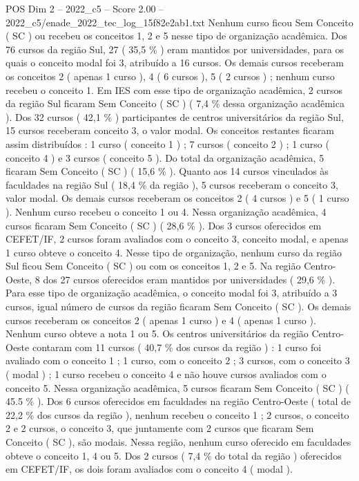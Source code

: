 \begin{textsample}{POS Dim 2 – 2022\_c5 – Score 2.00 – 2022\_c5/enade\_2022\_tec\_log\_15f82e2ab1.txt}
Nenhum curso ficou Sem Conceito ( SC ) ou recebeu os conceitos 1, 2 e 5 nesse tipo de organização acadêmica.
Dos 76 cursos da região Sul, 27 ( 35,5 \% ) eram mantidos por universidades, para os quais o conceito modal foi 3, atribuído a 16 cursos.
Os demais cursos receberam os conceitos 2 ( apenas 1 curso ), 4 ( 6 cursos ), 5 ( 2 cursos ) ; nenhum curso recebeu o conceito 1.
Em IES com esse tipo de organização acadêmica, 2 cursos da região Sul ficaram Sem Conceito ( SC ) ( 7,4 \% dessa organização acadêmica ).
Dos 32 cursos ( 42,1 \% ) participantes de centros universitários da região Sul, 15 cursos receberam conceito 3, o valor modal.
Os conceitos restantes ficaram assim distribuídos : 1 curso ( conceito 1 ) ; 7 cursos ( conceito 2 ) ; 1 curso ( conceito 4 ) e 3 cursos ( conceito 5 ).
Do total da organização acadêmica, 5 ficaram Sem Conceito ( SC ) ( 15,6 \% ).
Quanto aos 14 cursos vinculados às faculdades na região Sul ( 18,4 \% da região ), 5 cursos receberam o conceito 3, valor modal.
Os demais cursos receberam os conceitos 2 ( 4 cursos ) e 5 ( 1 curso ).
Nenhum curso recebeu o conceito 1 ou 4.
Nessa organização acadêmica, 4 cursos ficaram Sem Conceito ( SC ) ( 28,6 \% ).
Dos 3 cursos oferecidos em CEFET/IF, 2 cursos foram avaliados com o conceito 3, conceito modal, e apenas 1 curso obteve o conceito 4.
Nesse tipo de organização, nenhum curso da região Sul ficou Sem Conceito ( SC ) ou com os conceitos 1, 2 e 5.
Na região Centro-Oeste, 8 dos 27 cursos oferecidos eram mantidos por universidades ( 29,6 \% ).
Para esse tipo de organização acadêmica, o conceito modal foi 3, atribuído a 3 cursos, igual número de cursos da região ficaram Sem Conceito ( SC ).
Os demais cursos receberam os conceitos 2 ( apenas 1 curso ) e 4 ( apenas 1 curso ).
Nenhum curso obteve a nota 1 ou 5.
Os centros universitários da região Centro-Oeste contaram com 11 cursos ( 40,7 \% dos cursos da região ) : 1 curso foi avaliado com o conceito 1 ; 1 curso, com o conceito 2 ; 3 cursos, com o conceito 3 ( modal ) ; 1 curso recebeu o conceito 4 e não houve cursos avaliados com o conceito 5.
Nessa organização acadêmica, 5 cursos ficaram Sem Conceito ( SC ) ( 45.5 \% ).
Dos 6 cursos oferecidos em faculdades na região Centro-Oeste ( total de 22,2 \% dos cursos da região ), nenhum recebeu o conceito 1 ; 2 cursos, o conceito 2 e 2 cursos, o conceito 3, que juntamente com 2 cursos que ficaram Sem Conceito ( SC ), são modais.
Nessa região, nenhum curso oferecido em faculdades obteve o conceito 1, 4 ou 5.
Dos 2 cursos ( 7,4 \% do total da região ) oferecidos em CEFET/IF, os dois foram avaliados com o conceito 4 ( modal ).

\end{textsample}
